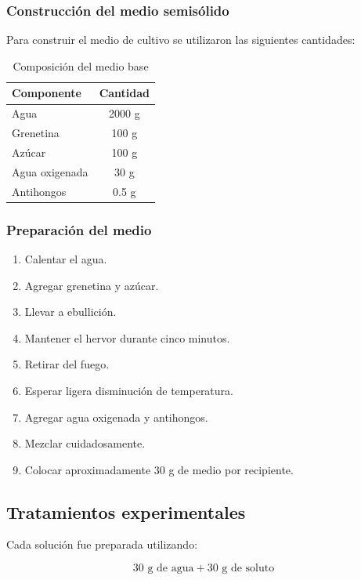 \subsubsection{Construcción del medio semisólido}

Para construir el medio de cultivo se utilizaron las siguientes cantidades:

\begin{table}[H]
\centering
\begin{tabular}{lc}
\toprule
Componente & Cantidad \\
\midrule
Agua & 2000 g \\
Grenetina & 100 g \\
Azúcar & 100 g \\
Agua oxigenada & 30 g \\
Antihongos & 0.5 g \\
\bottomrule
\end{tabular}
\caption{Composición del medio base}
\end{table}

\subsubsection{Preparación del medio}

\begin{enumerate}
    \item Calentar el agua.
    \item Agregar grenetina y azúcar.
    \item Llevar a ebullición.
    \item Mantener el hervor durante cinco minutos.
    \item Retirar del fuego.
    \item Esperar ligera disminución de temperatura.
    \item Agregar agua oxigenada y antihongos.
    \item Mezclar cuidadosamente.
    \item Colocar aproximadamente 30 g de medio por recipiente.
\end{enumerate}

\subsection{Tratamientos experimentales}

Cada solución fue preparada utilizando:

\[
30\text{ g de agua} + 30\text{ g de soluto}
\]

